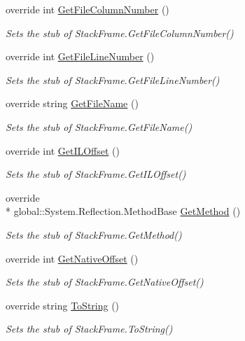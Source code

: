\begin{DoxyCompactItemize}
override int \hyperlink{class_system_1_1_diagnostics_1_1_fakes_1_1_stub_stack_frame_a799b977a67c9c9a5d41b5c3e4f342b45}{Get\-File\-Column\-Number} ()
\begin{DoxyCompactList}\small\item\em Sets the stub of Stack\-Frame.\-Get\-File\-Column\-Number()\end{DoxyCompactList}\item 
override int \hyperlink{class_system_1_1_diagnostics_1_1_fakes_1_1_stub_stack_frame_afa5841e4d5f703edbd915ba58d53e6ff}{Get\-File\-Line\-Number} ()
\begin{DoxyCompactList}\small\item\em Sets the stub of Stack\-Frame.\-Get\-File\-Line\-Number()\end{DoxyCompactList}\item 
override string \hyperlink{class_system_1_1_diagnostics_1_1_fakes_1_1_stub_stack_frame_a994661ca21584fd7bd4648c8efbb0022}{Get\-File\-Name} ()
\begin{DoxyCompactList}\small\item\em Sets the stub of Stack\-Frame.\-Get\-File\-Name()\end{DoxyCompactList}\item 
override int \hyperlink{class_system_1_1_diagnostics_1_1_fakes_1_1_stub_stack_frame_aef8ad8cf16ecab832ebbd0b62ad8ad21}{Get\-I\-L\-Offset} ()
\begin{DoxyCompactList}\small\item\em Sets the stub of Stack\-Frame.\-Get\-I\-L\-Offset()\end{DoxyCompactList}\item 
override \\*
global\-::\-System.\-Reflection.\-Method\-Base \hyperlink{class_system_1_1_diagnostics_1_1_fakes_1_1_stub_stack_frame_a35a29f5e1bdfaf271c1c906f73a5ad5f}{Get\-Method} ()
\begin{DoxyCompactList}\small\item\em Sets the stub of Stack\-Frame.\-Get\-Method()\end{DoxyCompactList}\item 
override int \hyperlink{class_system_1_1_diagnostics_1_1_fakes_1_1_stub_stack_frame_aad1b17fd8f03b0e60b4829852828f4bc}{Get\-Native\-Offset} ()
\begin{DoxyCompactList}\small\item\em Sets the stub of Stack\-Frame.\-Get\-Native\-Offset()\end{DoxyCompactList}\item 
override string \hyperlink{class_system_1_1_diagnostics_1_1_fakes_1_1_stub_stack_frame_a8cef075c1cf211f74758981fb8129529}{To\-String} ()
\begin{DoxyCompactList}\small\item\em Sets the stub of Stack\-Frame.\-To\-String()\end{DoxyCompactList}\end{DoxyCompactItemize}
